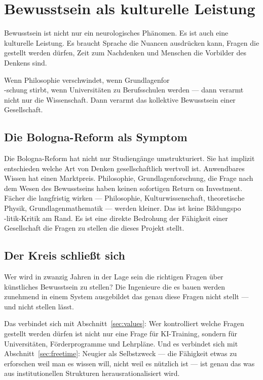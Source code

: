 \documentclass[fleqn,10pt]{SelfArx} %
\newlength{\tocsep}
\begin{document}

\section{Bewusstsein als kulturelle Leistung}
\label{sec:cultural}


Bewusstsein ist nicht nur ein neurologisches Phänomen. Es ist auch eine kulturelle Leistung. Es braucht Sprache die Nuancen ausdrücken kann, Fragen die gestellt werden dürfen, Zeit zum Nachdenken und Menschen die Vorbilder des Denkens sind.

Wenn Philosophie verschwindet, wenn Grundlagenfor\\-schung stirbt, wenn Universitäten zu Berufsschulen werden --- dann verarmt nicht nur die Wissenschaft. Dann verarmt das kollektive Bewusstsein einer Gesellschaft.

\subsection{Die Bologna-Reform als Symptom}

Die Bologna-Reform \cite{Bologna:1999} hat nicht nur Studiengänge umstrukturiert. Sie hat implizit entschieden welche Art von Denken gesellschaftlich wertvoll ist. Anwendbares Wissen hat einen Marktpreis. Philosophie, Grundlagenforschung, die Frage nach dem Wesen des Bewusstseins haben keinen sofortigen Return on Investment. Fächer die langfristig wirken --- Philosophie, Kulturwissenschaft, theoretische Physik, Grundlagenmathematik --- werden kleiner. Das ist keine Bildungspo\\-litik-Kritik am Rand. Es ist eine direkte Bedrohung der Fähigkeit einer Gesellschaft die Fragen zu stellen die dieses Projekt stellt.

\subsection{Der Kreis schließt sich}

Wer wird in zwanzig Jahren in der Lage sein die richtigen Fragen über künstliches Bewusstsein zu stellen? Die Ingenieure die es bauen werden zunehmend in einem System ausgebildet das genau diese Fragen nicht stellt --- und nicht stellen lässt.

Das verbindet sich mit Abschnitt~\ref{sec:values}: Wer kontrolliert welche Fragen gestellt werden dürfen ist nicht nur eine Frage für KI-Training, sondern für Universitäten, Förderprogramme und Lehrpläne. Und es verbindet sich mit Abschnitt~\ref{sec:freetime}: Neugier als Selbstzweck --- die Fähigkeit etwas zu erforschen weil man es wissen will, nicht weil es nützlich ist --- ist genau das was aus institutionellen Strukturen herausrationalisiert wird.
\end{document}
